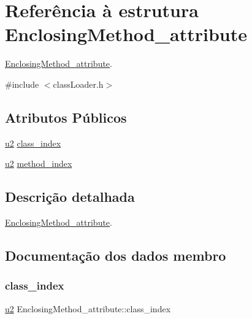 \hypertarget{struct_enclosing_method__attribute}{}\section{Referência à estrutura Enclosing\+Method\+\_\+attribute}
\label{struct_enclosing_method__attribute}


\hyperlink{struct_enclosing_method__attribute}{Enclosing\+Method\+\_\+attribute}.  




{\ttfamily \#include $<$class\+Loader.\+h$>$}

\subsection*{Atributos Públicos}
\begin{DoxyCompactItemize}
\item 
\hyperlink{util_8h_a55ef8d87fd202b8417704c089899c5b9}{u2} \hyperlink{struct_enclosing_method__attribute_ad9cac7d5d8a406624bc482df8dfe19a9}{class\+\_\+index}
\item 
\hyperlink{util_8h_a55ef8d87fd202b8417704c089899c5b9}{u2} \hyperlink{struct_enclosing_method__attribute_a209cdae51c9033a08050a85c5581d481}{method\+\_\+index}
\end{DoxyCompactItemize}


\subsection{Descrição detalhada}
\hyperlink{struct_enclosing_method__attribute}{Enclosing\+Method\+\_\+attribute}. 

\subsection{Documentação dos dados membro}
\mbox{\label{struct_enclosing_method__attribute_ad9cac7d5d8a406624bc482df8dfe19a9}} 
\subsubsection{\texorpdfstring{class\+\_\+index}{class\_index}}
{\footnotesize\ttfamily \hyperlink{util_8h_a55ef8d87fd202b8417704c089899c5b9}{u2} Enclosing\+Method\+\_\+attribute\+::class\+\_\+index}

